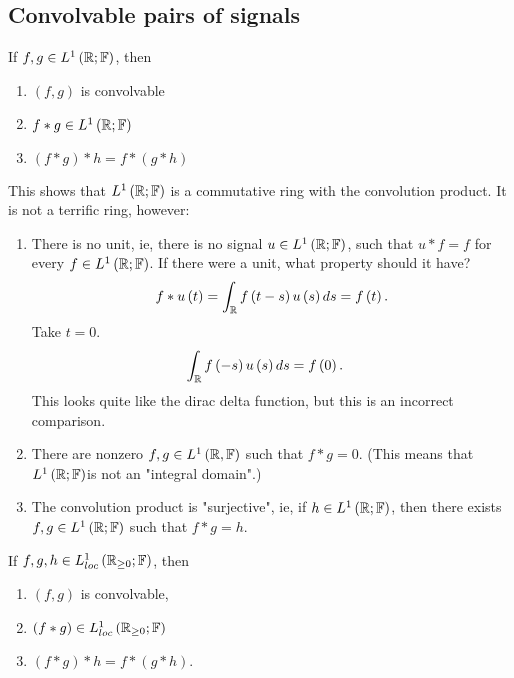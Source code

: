 \subsection{Convolvable pairs of signals}
\begin{theorem}
	If $f, g \in  L^{1}\left( \mathbb{R}; \mathbb{F} \right) $, then 
	\begin{enumerate}
		\item $\left( f, g \right) $ is convolvable 
		\item $f * g \in L^{1}\left( \mathbb{R}; \mathbb{F} \right) $ 
		\item $\left( f * g  \right)  * h = f * \left( g * h \right) $
	\end{enumerate}

\end{theorem}
	This shows that $L^{1}\left( \mathbb{R}; \mathbb{F} \right) $ is a commutative ring with the convolution product. It is not a terrific ring, however: 
	\begin{enumerate}
		\item There is no unit, ie, there is no signal $u \in  L^{1}\left( \mathbb{R}; \mathbb{F} \right) $, such that $u * f = f$ for every $f \in  L^{1}\left( \mathbb{R}; \mathbb{F} \right) $. If there were a unit, what property should it have?
			\[
				f * u \left( t  \right) = \int_{ \mathbb{R}}^{ } f \left( t - s  \right) u\left( s\right)d s   = f \left( t  \right) 
			.\] 
			Take $t = 0$. 
			\begin{align*}
				\int_{ \mathbb{R}}^{ } f \left( -s \right) u \left( s \right) d s &= f\left( 0 \right) 
			.\end{align*}
			This looks quite like the dirac delta function, but this is an incorrect comparison.
		\item There are nonzero $f, g \in  L^{1}\left( \mathbb{R}, \mathbb{F} \right) $ such that $f * g = 0$. (This means that $L^{1}\left( \mathbb{R}; \mathbb{F} \right) $is not an "integral domain".)
		\item The convolution product is "surjective", ie, if $h \in  L^{1}\left( \mathbb{R}; \mathbb{F} \right) $, then there exists $f, g \in  L^{1}\left( \mathbb{R}; \mathbb{F} \right) $ such that $f * g = h$.
	\end{enumerate}
\begin{theorem}
	If $f, g, h \in L^{1}_{loc}\left( \mathbb{R}_{\ge  0}; \mathbb{F} \right) $, then 
	\begin{enumerate}
		\item $\left( f, g \right) $ is convolvable, 
		\item $\left( f * g \right) \in  L^{1}_{loc}\left( \mathbb{R}_{\ge  0}; \mathbb{F} \right) $
		\item $\left( f * g \right) * h = f * \left( g * h \right) $.
	\end{enumerate}
\end{theorem}
